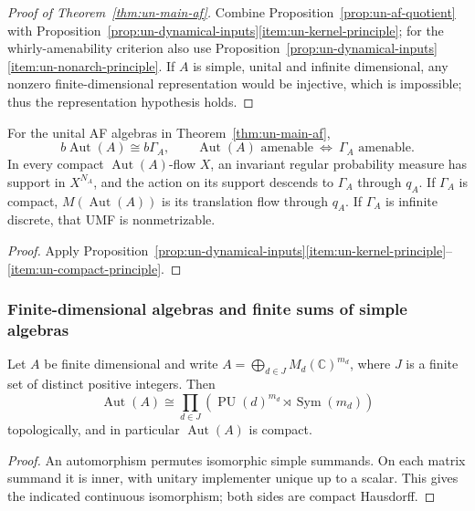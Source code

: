 \begin{proof}[Proof of Theorem~\ref{thm:un-main-af}]
Combine Proposition~\ref{prop:un-af-quotient} with
Proposition~\ref{prop:un-dynamical-inputs}\ref{item:un-kernel-principle};
for the whirly-amenability criterion also use
Proposition~\ref{prop:un-dynamical-inputs}\ref{item:un-nonarch-principle}.
If \(A\) is simple, unital and infinite dimensional, any nonzero
finite-dimensional representation would be injective, which is
impossible; thus the representation hypothesis holds.
\end{proof}

\begin{corollary}\label{cor:un-af-consequences}
For the unital AF algebras in Theorem~\ref{thm:un-main-af},
\[
 b\operatorname{Aut}(A)\cong b\Gamma_A,\qquad
\operatorname{Aut}(A)\text{ amenable}\ \Longleftrightarrow\
\Gamma_A\text{ amenable}.
\]
In every compact \(\operatorname{Aut}(A)\)-flow \(X\), an invariant regular
probability measure has support in \(X^{N_A}\), and the action on its
support descends to \(\Gamma_A\) through \(q_A\).
If \(\Gamma_A\) is compact, \(M(\operatorname{Aut}(A))\) is its translation
flow through \(q_A\). If \(\Gamma_A\) is infinite discrete, that
UMF is nonmetrizable.
\end{corollary}
\begin{proof}
Apply Proposition~\ref{prop:un-dynamical-inputs}\ref{item:un-kernel-principle}--\ref{item:un-compact-principle}.
\end{proof}


\subsubsection{Finite-dimensional algebras and finite sums of simple algebras}
\begin{lemma}\label{lem:un-finite-af}
Let \(A\) be finite dimensional and write
\(A=\bigoplus_{d\in J}M_d(\mathbb C)^{m_d}\), where \(J\) is a finite set of
distinct positive integers. Then
\[
 \operatorname{Aut}(A)\cong
 \prod_{d\in J}\left(\operatorname{PU}(d)^{m_d}
                    \rtimes\operatorname{Sym}(m_d)\right)
\]
topologically, and in particular \(\operatorname{Aut}(A)\) is compact.
\end{lemma}
\begin{proof}
An automorphism permutes isomorphic simple summands. On each
matrix summand it is inner, with unitary implementer unique up
to a scalar. This gives the indicated continuous isomorphism;
both sides are compact Hausdorff. 
\end{proof}

